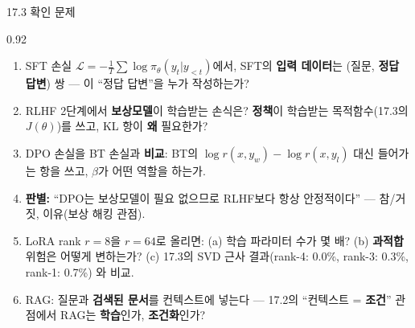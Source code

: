 \begin{frame}{17.3 확인 문제}
\begin{center}\begin{varwidth}{0.92\textwidth}
  \small
  \begin{enumerate}
    \item SFT 손실 $\mathcal{L} = -\frac{1}{T}\sum
      \log \pi_\theta(y_t | y_{<t})$에서, SFT의 \textbf{입력
      데이터}는 (질문, \textbf{정답 답변}) 쌍 — 이 ``정답
      답변''을 누가 작성하는가?
    \item RLHF 2단계에서 \textbf{보상모델}이 학습받는
      손식은? \textbf{정책}이 학습받는 목적함수(17.3의
      $J(\theta)$)를 쓰고, KL 항이 \textbf{왜} 필요한가?
    \item DPO 손실을 BT 손실과 \textbf{비교}: BT의
      $\log r(x, y_w) - \log r(x, y_l)$ 대신 들어가는
      항을 쓰고, $\beta$가 어떤 역할을 하는가.
    \item \textbf{판별:} ``DPO는 보상모델이 필요 없으므로
      RLHF보다 항상 안정적이다'' — 참/거짓, 이유(보상 해킹
      관점).
    \item LoRA rank $r = 8$을 $r = 64$로 올리면:
      (a) 학습 파라미터 수가 몇 배? (b) \textbf{과적합}
      위험은 어떻게 변하는가? (c) 17.3의 SVD 근사
      결과(rank-4: 0.0\%, rank-3: 0.3\%, rank-1: 0.7\%)
      와 비교.
    \item RAG: 질문과 \textbf{검색된 문서}를 컨텍스트에
      넣는다 — 17.2의 ``컨텍스트 = \textbf{조건}'' 관점에서
      RAG는 \textbf{학습}인가, \textbf{조건화}인가?
  \end{enumerate}
\end{varwidth}\end{center}
\end{frame}
